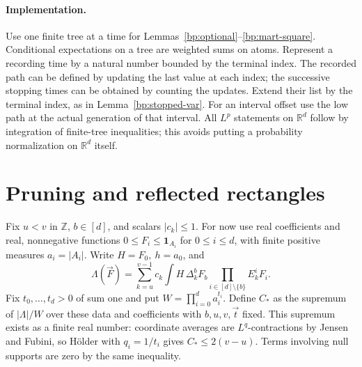 \documentclass[11pt,letterpaper]{article}
\theoremstyle{definition}
\newcommand{\R}{\mathbb R}
\newcommand{\Z}{\mathbb Z}
\newcommand{\ind}{\mathbf1}
\begin{document}
\paragraph{Implementation.}
Use one finite tree at a time for Lemmas~\ref{bp:optional}--\ref{bp:mart-square}.
Conditional expectations on a tree are weighted sums on atoms.
Represent a recording time by a natural number bounded by the terminal
index. The recorded path can be defined by updating the last value at
each index; the successive stopping times can be obtained by counting
the updates. Extend their list by the terminal index, as in
Lemma~\ref{bp:stopped-var}. For an interval offset use the low path at
the actual generation of that interval. All \(L^p\) statements on
\(\R^d\) follow by integration of finite-tree inequalities; this avoids
putting a probability normalization on \(\R^d\) itself.

\section{Pruning and reflected rectangles}
Fix \(u<v\) in \(\Z\), \(b\in[d]\), and scalars \(|c_k|\le1\). For now
use real coefficients and real, nonnegative functions
\(0\le F_i\le\ind_{A_i}\) for \(0\le i\le d\), with finite positive
measures \(a_i=|A_i|\). Write \(H=F_0,\ h=a_0\), and
\[
  \Lambda(\vec F)=\sum_{k=u}^{v-1}c_k
       \int H\,\Delta_k^b F_b\prod_{i\in[d]\setminus\{b\}}E_k^iF_i .
\]
Fix \(t_0,\ldots,t_d>0\) of sum one and put \(W=\prod_{i=0}^d a_i^{t_i}\).
Define \(C_*\) as the supremum of \(|\Lambda|/W\) over these data
and coefficients with \(b,u,v,\vec t\) fixed. This supremum exists as
a finite real number: coordinate averages are \(L^q\)-contractions by
Jensen and Fubini, so H\"older with \(q_i=1/t_i\) gives
\(C_*\le2(v-u)\). Terms involving null supports are zero by the same
inequality.
\end{document}

